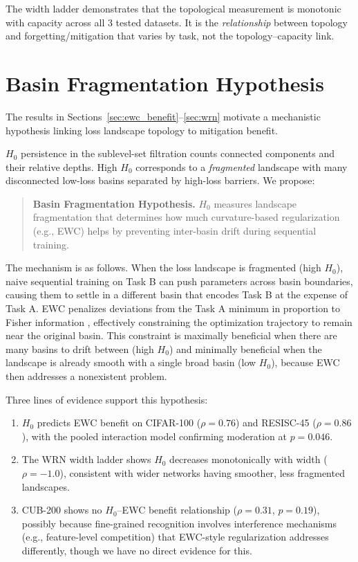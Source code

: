 \documentclass[10pt,twocolumn]{article}
\begin{document}
The width ladder demonstrates that the topological measurement is monotonic with capacity across all 3 tested datasets. It is the \emph{relationship} between topology and forgetting/mitigation that varies by task, not the topology--capacity link.

\section{Basin Fragmentation \mbox{Hypothesis}}
\label{sec:hypothesis}

The results in Sections~\ref{sec:ewc_benefit}--\ref{sec:wrn} motivate a mechanistic hypothesis linking loss landscape topology to mitigation benefit.

$H_0$ persistence in the sublevel-set filtration counts connected components and their relative depths. High $H_0$ corresponds to a \emph{fragmented} landscape with many disconnected low-loss basins separated by high-loss barriers. We propose:

\begin{quote}
\textbf{Basin Fragmentation Hypothesis.} $H_0$ measures landscape fragmentation that determines how much curvature-based regularization (e.g., EWC) helps by preventing inter-basin drift during sequential training.
\end{quote}

The mechanism is as follows. When the loss landscape is fragmented (high $H_0$), naive sequential training on Task B can push parameters across basin boundaries, causing them to settle in a different basin that encodes Task B at the expense of Task A. EWC penalizes deviations from the Task A minimum in proportion to Fisher information \citep{kirkpatrick2017overcoming}, effectively constraining the optimization trajectory to remain near the original basin. This constraint is maximally beneficial when there are many basins to drift between (high $H_0$) and minimally beneficial when the landscape is already smooth with a single broad basin (low $H_0$), because EWC then addresses a nonexistent problem.

Three lines of evidence support this hypothesis:
\begin{enumerate}
    \item $H_0$ predicts EWC benefit on CIFAR-100 ($\rho = 0.76$) and RESISC-45 ($\rho = 0.86$), with the pooled interaction model confirming moderation at $p = 0.046$.
    \item The WRN width ladder shows $H_0$ decreases monotonically with width ($\rho = -1.0$), consistent with wider networks having smoother, less fragmented landscapes.
    \item CUB-200 shows no $H_0$--EWC benefit relationship ($\rho = 0.31$, $p = 0.19$), possibly because fine-grained recognition involves interference mechanisms (e.g., feature-level competition) that EWC-style regularization addresses differently, though we have no direct evidence for this.
\end{enumerate}
\end{document}
